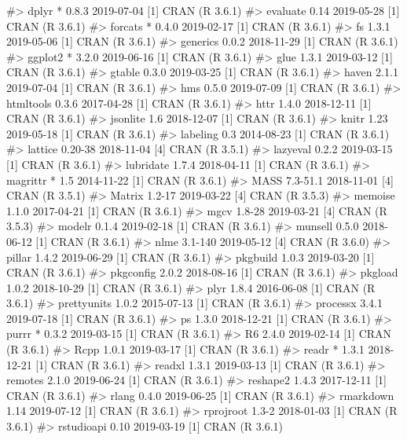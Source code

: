 \documentclass[
]{jss}
\begin{document}
\begin{CodeChunk}
\begin{CodeOutput}
#>  dplyr       * 0.8.3      2019-07-04 [1] CRAN (R 3.6.1)
#>  evaluate      0.14       2019-05-28 [1] CRAN (R 3.6.1)
#>  forcats     * 0.4.0      2019-02-17 [1] CRAN (R 3.6.1)
#>  fs            1.3.1      2019-05-06 [1] CRAN (R 3.6.1)
#>  generics      0.0.2      2018-11-29 [1] CRAN (R 3.6.1)
#>  ggplot2     * 3.2.0      2019-06-16 [1] CRAN (R 3.6.1)
#>  glue          1.3.1      2019-03-12 [1] CRAN (R 3.6.1)
#>  gtable        0.3.0      2019-03-25 [1] CRAN (R 3.6.1)
#>  haven         2.1.1      2019-07-04 [1] CRAN (R 3.6.1)
#>  hms           0.5.0      2019-07-09 [1] CRAN (R 3.6.1)
#>  htmltools     0.3.6      2017-04-28 [1] CRAN (R 3.6.1)
#>  httr          1.4.0      2018-12-11 [1] CRAN (R 3.6.1)
#>  jsonlite      1.6        2018-12-07 [1] CRAN (R 3.6.1)
#>  knitr         1.23       2019-05-18 [1] CRAN (R 3.6.1)
#>  labeling      0.3        2014-08-23 [1] CRAN (R 3.6.1)
#>  lattice       0.20-38    2018-11-04 [4] CRAN (R 3.5.1)
#>  lazyeval      0.2.2      2019-03-15 [1] CRAN (R 3.6.1)
#>  lubridate     1.7.4      2018-04-11 [1] CRAN (R 3.6.1)
#>  magrittr    * 1.5        2014-11-22 [1] CRAN (R 3.6.1)
#>  MASS          7.3-51.1   2018-11-01 [4] CRAN (R 3.5.1)
#>  Matrix        1.2-17     2019-03-22 [4] CRAN (R 3.5.3)
#>  memoise       1.1.0      2017-04-21 [1] CRAN (R 3.6.1)
#>  mgcv          1.8-28     2019-03-21 [4] CRAN (R 3.5.3)
#>  modelr        0.1.4      2019-02-18 [1] CRAN (R 3.6.1)
#>  munsell       0.5.0      2018-06-12 [1] CRAN (R 3.6.1)
#>  nlme          3.1-140    2019-05-12 [4] CRAN (R 3.6.0)
#>  pillar        1.4.2      2019-06-29 [1] CRAN (R 3.6.1)
#>  pkgbuild      1.0.3      2019-03-20 [1] CRAN (R 3.6.1)
#>  pkgconfig     2.0.2      2018-08-16 [1] CRAN (R 3.6.1)
#>  pkgload       1.0.2      2018-10-29 [1] CRAN (R 3.6.1)
#>  plyr          1.8.4      2016-06-08 [1] CRAN (R 3.6.1)
#>  prettyunits   1.0.2      2015-07-13 [1] CRAN (R 3.6.1)
#>  processx      3.4.1      2019-07-18 [1] CRAN (R 3.6.1)
#>  ps            1.3.0      2018-12-21 [1] CRAN (R 3.6.1)
#>  purrr       * 0.3.2      2019-03-15 [1] CRAN (R 3.6.1)
#>  R6            2.4.0      2019-02-14 [1] CRAN (R 3.6.1)
#>  Rcpp          1.0.1      2019-03-17 [1] CRAN (R 3.6.1)
#>  readr       * 1.3.1      2018-12-21 [1] CRAN (R 3.6.1)
#>  readxl        1.3.1      2019-03-13 [1] CRAN (R 3.6.1)
#>  remotes       2.1.0      2019-06-24 [1] CRAN (R 3.6.1)
#>  reshape2      1.4.3      2017-12-11 [1] CRAN (R 3.6.1)
#>  rlang         0.4.0      2019-06-25 [1] CRAN (R 3.6.1)
#>  rmarkdown     1.14       2019-07-12 [1] CRAN (R 3.6.1)
#>  rprojroot     1.3-2      2018-01-03 [1] CRAN (R 3.6.1)
#>  rstudioapi    0.10       2019-03-19 [1] CRAN (R 3.6.1)

\end{CodeOutput}
\end{CodeChunk}
\end{document}
